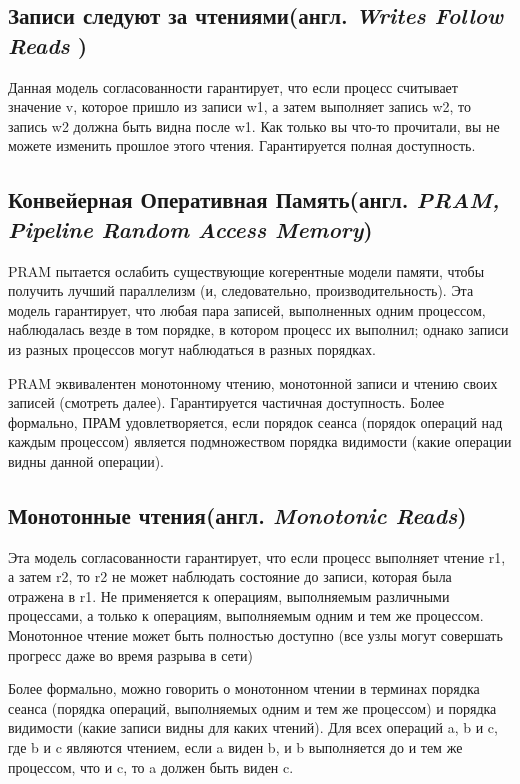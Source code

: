 \documentclass[12pt,  openany]{book}
\begin{document}
\subsection{Записи следуют за чтениями(англ.  \textit{Writes Follow Reads })}
Данная модель согласованности гарантирует, что если процесс считывает значение v, которое пришло из записи w1, а затем выполняет запись w2, то запись w2 должна быть видна после w1. Как только вы что-то прочитали, вы не можете изменить прошлое этого чтения. Гарантируется полная доступность.

\subsection{Конвейерная Оперативная Память(англ.  \textit{PRAM, Pipeline Random Access Memory})}
PRAM пытается ослабить существующие когерентные модели памяти, чтобы получить лучший параллелизм (и, следовательно, производительность). Эта модель гарантирует, что любая пара записей, выполненных одним процессом, наблюдалась везде в том порядке, в котором процесс их выполнил; однако записи из разных процессов могут наблюдаться в разных порядках. 
\par
PRAM эквивалентен монотонному чтению, монотонной записи и чтению своих записей (смотреть далее).
Гарантируется частичная доступность.
Более формально, ПРАМ удовлетворяется, если порядок сеанса (порядок операций над каждым процессом) является подмножеством порядка видимости (какие операции видны данной операции).

\subsection{Монотонные чтения(англ.  \textit{Monotonic Reads})}
Эта модель согласованности гарантирует, что если процесс выполняет чтение r1, а затем r2, то r2 не может наблюдать состояние до записи, которая была отражена в r1.
Не применяется к операциям, выполняемым различными процессами, а только к операциям, выполняемым одним и тем же процессом.
Монотонное чтение может быть полностью доступно (все узлы могут совершать прогресс даже во время разрыва в сети)
\par
Более формально, можно говорить о монотонном чтении в терминах порядка сеанса (порядка операций, выполняемых одним и тем же процессом) и порядка видимости (какие записи видны для каких чтений). Для всех операций a, b и c, где b и c являются чтением, если a виден b, и b выполняется до и тем же процессом, что и c, то a должен быть виден c.
\end{document}
